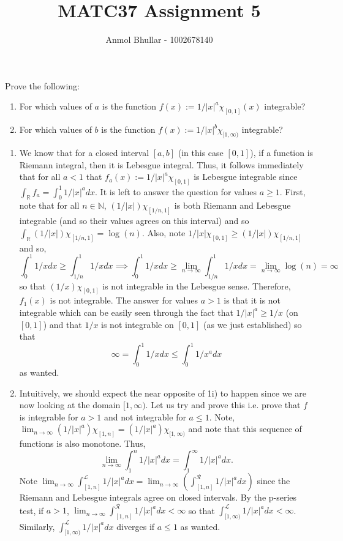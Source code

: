\documentclass[12pt]{article}
\newenvironment{solution}[2][Solution]{\begin{trivlist}
\item[\hskip \labelsep {\bfseries #1}]}{\end{trivlist}}
\newenvironment{problem}[2][Problem]{\begin{trivlist}
\item[\hskip \labelsep {\bfseries #1}\hskip \labelsep {\bfseries #2.}]}{\end{trivlist}}
\begin{document}
 
\title{MATC37 Assignment 5}
\author{Anmol Bhullar - 1002678140}
 
\maketitle


\begin{problem}{1}
    Prove the following:
    \begin{enumerate}
        \item[i.] For which values of $a$ is the function $f(x) := 1/|x|^{a}\chi_{[0,1]}(x)$ integrable?
        \item[ii.] For which values of $b$ is the function $f(x) := 1/|x|^{b}\chi_{[1,\infty)}$ integrable?
    \end{enumerate}
\end{problem}

\begin{solution}{}
    \begin{enumerate}
        \item[(i.)] We know that for a closed interval $[a,b]$ (in this case $[0,1]$), if a function is Riemann integral, then it is Lebesgue integral. Thus, it follows immediately that
        for all $a<1$ that $f_a(x) := 1/|x|^a\chi_{[0,1]}$ is Lebesgue integrable since $\int_{\mathbb{R}} f_a = \int_0^1 1/|x|^adx$. It is left to answer the question for values $a\geq 1$.
	First, note that for all $n\in\mathbb{N}$, $(1/|x|)\chi_{[1/n,1]}$ is both Riemann and Lebesgue integrable (and so their values agrees on this interval) and so
	$\int_{\mathbb{R}} (1/|x|)\chi_{[1/n,1]} = \log(n)$. Also, note $1/|x|\chi_{[0,1]} \geq (1/|x|)\chi_{[1/n,1]}$ and so,
	\[ \int_0^1 1/xdx \geq \int_{1/n}^1 1/xdx \implies \int_0^1 1/xdx \geq \lim_{n\to\infty} \int_{1/n}^1 1/xdx= \lim_{n\to\infty} \log(n) = \infty \]
	so that $(1/x)\chi_{[0,1]}$ is not integrable in the Lebesgue sense. Therefore, $f_1(x)$ is not integrable. The answer for values $a>1$ is that it is not integrable which can be
	easily seen through the fact that $1/|x|^a \geq 1/x$ (on $[0,1]$) and that $1/x$ is not integrable on $[0,1]$ (as we just established) so that
	\[ \infty = \int_0^1 1/xdx \leq \int_0^1 1/x^adx \]
	as wanted.
        \item[(ii.)] Intuitively, we should expect the near opposite of 1i) to happen since we are now looking at the domain $[1,\infty)$. Let us try and prove this i.e. prove that $f$
        is integrable for $a>1$ and not integrable for $a\leq 1$. Note, $\lim_{n\to\infty} (1/|x|^a)\chi_{[1,n]} = (1/|x|^a)\chi_{[1,\infty)}$ and note that this sequence
        of functions is also monotone. Thus,
        \[ \lim_{n\to\infty} \int_1^n 1/|x|^adx = \int_1^{\infty} 1/|x|^adx. \]
	Note $\lim_{n\to\infty} \int_{[1,n]}^{\mathcal{L}} 1/|x|^adx = \lim_{n\to\infty} (\int_{[1,n]}^{\mathcal{R}} 1/|x|^adx)$ since the Riemann and Lebesgue integrals agree on closed
	intervals. By the p-series test, if $a>1$, $\lim_{n\to\infty} \int_{[1,n]}^{\mathcal{R}} 1/|x|^adx < \infty$ so that $\int_{[1,\infty)}^{\mathcal{L}} 1/|x|^adx < \infty$. Similarly,
	$\int_{[1,\infty)}^{\mathcal{L}} 1/|x|^adx$ diverges if $a\leq 1$ as wanted.
    \end{enumerate}
\end{solution}
\end{document}
